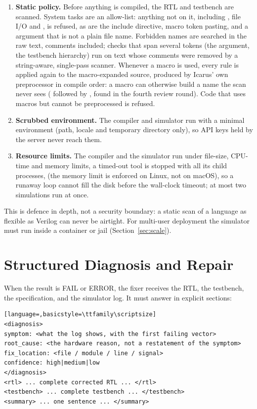 \begin{enumerate}[label=\textbf{\arabic*.}]
\item \textbf{Static policy.} Before anything is compiled, the RTL and testbench are scanned. System tasks are an allow-list: anything not on it, including , file I/O and , is refused, as are the include directive, macro token pasting, and a  argument that is not a plain file name. Forbidden names are searched in the raw text, comments included; checks that span several tokens (the  argument, the testbench hierarchy) run on text whose comments were removed by a string-aware, single-pass scanner. Whenever a macro is used, every rule is applied again to the macro-expanded source, produced by Icarus' own preprocessor in compile order: a macro can otherwise build a name the scan never sees ( followed by , found in the fourth review round). Code that uses macros but cannot be preprocessed is refused.
\item \textbf{Scrubbed environment.} The compiler and simulator run with a minimal environment (path, locale and temporary directory only), so API keys held by the server never reach them.
\item \textbf{Resource limits.} The compiler and the simulator run under file-size, CPU-time and memory limits, a timed-out tool is stopped with all its child processes, (the memory limit is enforced on Linux, not on macOS), so a runaway  loop cannot fill the disk before the wall-clock timeout; at most two simulations run at once.
\end{enumerate}

This is defence in depth, not a security boundary: a static scan of a language as flexible as Verilog can never be airtight. For multi-user deployment the simulator must run inside a container or jail (Section~\ref{sec:scale}).

\section{Structured Diagnosis and Repair}
\label{sec:loop}
When the result is FAIL or ERROR, the fixer receives the RTL, the testbench, the
specification, and the simulator log. It must answer in explicit sections:

\begin{lstlisting}[language=,basicstyle=\ttfamily\scriptsize]
<diagnosis>
symptom: <what the log shows, with the first failing vector>
root_cause: <the hardware reason, not a restatement of the symptom>
fix_location: <file / module / line / signal>
confidence: high|medium|low
</diagnosis>
<rtl> ... complete corrected RTL ... </rtl>
<testbench> ... complete testbench ... </testbench>
<summary> ... one sentence ... </summary>
\end{lstlisting}

